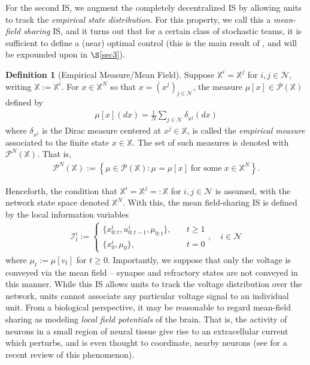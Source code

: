 \documentclass[12pt, oneside]{report}
\newcommand{\mbb}[1]{\mathbb{#1}}
\newcommand{\1}[1]{\mathbbm{1}_{\{#1\}}}
\newcommand{\mc}[1]{\mathcal{#1}}
\theoremstyle{definition}
\newtheorem{definition}[theorem]{Definition}
\begin{document}
For the second IS, we augment the completely decentralized IS by allowing units to track the \textit{empirical state distribution}. For this property, we call this a \textit{mean-field sharing} IS, and it turns out that
for a certain class of stochastic teams, it is sufficient to define a (near) optimal control (this is the main result of \cite{Sanjari_Saldi_Yüksel_2024}, and will be expounded upon in $\S$\ref{sec3}).
\begin{definition}[Empirical Measure/Mean Field]\label{def25} Suppose
    $\mbb{X}^i=\mbb{X}^j$ for $i,j\in\mc{N}$, writing $\mbb{X}:=\mbb{X}^i$.
    For $x\in\mbb{X}^N$ so that
    $x=(x^j)_{j\in\mc{N}}$, the measure $\mu[x]\in\mc{P}(\mbb{X})$ defined by
    \begin{align*}
        \mu[x](dx)=\frac{1}{N}\sum_{j\in\mc{N}}\delta_{x^j}(dx)
    \end{align*}
    where $\delta_{x^j}$ is the Dirac measure centered at $x^j\in\mbb{X}$, is
    called the {\it empirical measure} associated to the
    finite state $x\in\mbb{X}$. The set of such measures is denoted with $\mc{P}^N(\mbb{X})$. That is,
    \begin{align*}
        \mc{P}^N(\mbb{X}):=\left\{\mu\in\mc{P}(\mbb{X}):\mu=\mu[x]\;\text{for some}\;x\in\mbb{X}^N\right\}.
    \end{align*}
\end{definition}
Henceforth, the condition that $\mbb{X}^i=\mbb{X}^j=:\mbb{X}$ for $i,j\in\mc{N}$ is assumed, with the network state space denoted $\mbb{X}^N$.
With this, the mean field-sharing IS is defined by the local information variables
\begin{align}
    \mc{I}^i_t:=\begin{cases}
        \{x^i_{0:t},u^i_{0:t-1},\mu_{0:t}\},\quad&\text{$t\geq 1$}\\
        \{x^i_0,\mu_0\},\quad&\text{$t=0$}
    \end{cases},\quad i\in\mc{N}\label{eq59}
\end{align}
where $\mu_t:=\mu[v_t]$ for $t\geq 0$. Importantly, we suppose that only the voltage is conveyed via the mean field -- synapse and
refractory states are not conveyed in this manner. While this IS allows units to track the voltage distribution over the network, units cannot
associate any particular voltage signal to an individual unit. From a biological perspective, it may be reasonable to regard mean-field sharing as modeling
\textit{local field potentials} of the brain. That is, the activity of neurons in a small region of neural tissue give rise to an extracellular current which
perturbs, and is even thought to coordinate, nearby neurons (see \cite{Herreras_2016} for a recent review of this phenomenon). 
\end{document}
